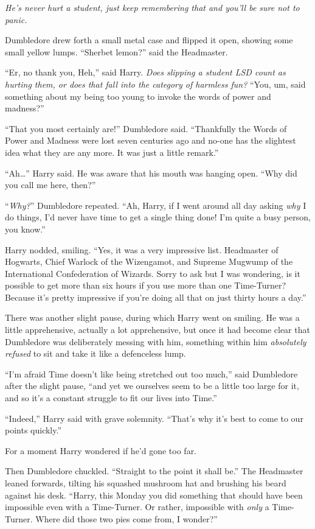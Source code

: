 \emph{He’s never hurt a student, just keep remembering that and you’ll be sure not to panic.}

Dumbledore drew forth a small metal case and flipped it open, showing some small yellow lumps. “Sherbet lemon?” said the Headmaster.

“Er, no thank you, Heh,” said Harry. \emph{Does slipping a student LSD count as hurting them, or does that fall into the category of harmless fun?} “You, um, said something about my being too young to invoke the words of power and madness?”

“That you most certainly are!” Dumbledore said. “Thankfully the Words of Power and Madness were lost seven centuries ago and no-one has the slightest idea what they are any more. It was just a little remark.”

“Ah…” Harry said. He was aware that his mouth was hanging open. “Why did you call me here, then?”

“\emph{Why?}” Dumbledore repeated. “Ah, Harry, if I went around all day asking \emph{why} I do things, I’d never have time to get a single thing done! I’m quite a busy person, you know.”

Harry nodded, smiling. “Yes, it was a very impressive list. Headmaster of Hogwarts, Chief Warlock of the Wizengamot, and Supreme Mugwump of the International Confederation of Wizards. Sorry to ask but I was wondering, is it possible to get more than six hours if you use more than one Time-Turner? Because it’s pretty impressive if you’re doing all that on just thirty hours a day.”

There was another slight pause, during which Harry went on smiling. He was a little apprehensive, actually a lot apprehensive, but once it had become clear that Dumbledore was deliberately messing with him, something within him \emph{absolutely refused} to sit and take it like a defenceless lump.

“I’m afraid Time doesn’t like being stretched out too much,” said Dumbledore after the slight pause, “and yet we ourselves seem to be a little too large for it, and so it’s a constant struggle to fit our lives into Time.”

“Indeed,” Harry said with grave solemnity. “That’s why it’s best to come to our points quickly.”

For a moment Harry wondered if he’d gone too far.

Then Dumbledore chuckled. “Straight to the point it shall be.” The Headmaster leaned forwards, tilting his squashed mushroom hat and brushing his beard against his desk. “Harry, this Monday you did something that should have been impossible even with a Time-Turner. Or rather, impossible with \emph{only} a Time-Turner. Where did those two pies come from, I wonder?”

